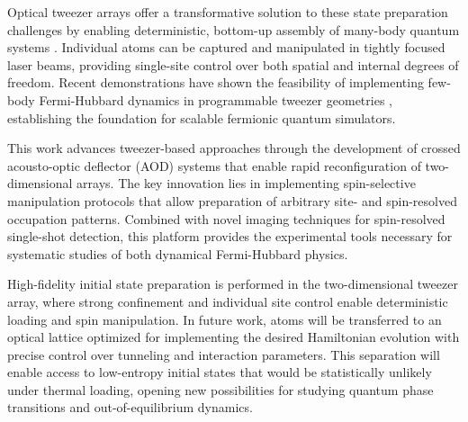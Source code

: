 Optical tweezer arrays offer a transformative solution to these state preparation challenges by enabling deterministic, bottom-up assembly of many-body quantum systems \cite{browaeys_many-body_2020}. Individual atoms can be captured and manipulated in tightly focused laser beams, providing single-site control over both spatial and internal degrees of freedom. Recent demonstrations have shown the feasibility of implementing few-body Fermi-Hubbard dynamics in programmable tweezer geometries \cite{spar_realization_2022,yan_two-dimensional_2022}, establishing the foundation for scalable fermionic quantum simulators.

This work advances tweezer-based approaches through the development of crossed acousto-optic deflector (AOD) systems that enable rapid reconfiguration of two-dimensional arrays. The key innovation lies in implementing spin-selective manipulation protocols that allow preparation of arbitrary site- and spin-resolved occupation patterns. Combined with novel imaging techniques for spin-resolved single-shot detection, this platform provides the experimental tools necessary for systematic studies of both dynamical Fermi-Hubbard physics.


High-fidelity initial state preparation is performed in the two-dimensional tweezer array, where strong confinement and individual site control enable deterministic loading and spin manipulation. In future work, atoms will be transferred to an optical lattice optimized for implementing the desired Hamiltonian evolution with precise control over tunneling and interaction parameters. This separation will enable access to low-entropy initial states that would be statistically unlikely under thermal loading, opening new possibilities for studying quantum phase transitions and out-of-equilibrium dynamics.